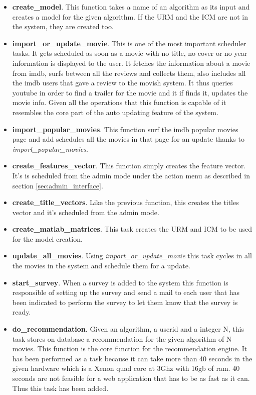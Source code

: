 \begin{itemize}
\item \textbf{create\_model}. This function takes a name of an algorithm as its input and creates a model for the given algorithm. If the URM and the ICM are not in the system, they are created too.
\item \textbf{import\_or\_update\_movie}. This is one of the most important scheduler tasks. It gets scheduled as soon as a movie with no title, no cover or no year information is displayed to the user. It fetches the information about a movie from imdb, surfs between all the reviews and collects them, also includes all the imdb users that gave a review to the movish system. It thus queries youtube in order to find a trailer for the movie and it if finds it, updates the movie info. Given all the operations that this function is capable of it resembles the core part of the auto updating feature of the system.
\item \textbf{import\_popular\_movies}. This function surf the imdb popular movies page and add schedules all the movies in that page for an update thanks to \textit{import\_popular\_movies}.
\item \textbf{create\_features\_vector}. This function simply creates the feature vector. It's is scheduled from the admin mode under the action menu as described in section \ref{sec:admin_interface}.
\item \textbf{create\_title\_vectors}. Like the previous function, this creates the titles vector and it's scheduled from the admin mode.
\item \textbf{create\_matlab\_matrices}. This task creates the \ac{URM} and \ac{ICM} to be used for the model creation.
\item \textbf{update\_all\_movies}. Using \textit{import\_or\_update\_movie} this task cycles in all the movies in the system and schedule them for a update.
\item \textbf{start\_survey}. When a survey is added to the system this function is responsible of setting up the survey and send a mail to each user that has been indicated to perform the survey to let them know that the survey is ready.
\item \textbf{do\_recommendation}. Given an algorithm, a userid and a integer N, this task stores on database a recommendation for the given algorithm of N movies. This function is the core function for the recommendation engine. It has been performed as a task because it can take more than 40 seconds in the given hardware which is a Xenon quad core at 3Ghz with 16gb of ram. 40 seconds are not feasible for a web application that has to be as fast as it can. Thus this task has been added.
\end{itemize}

